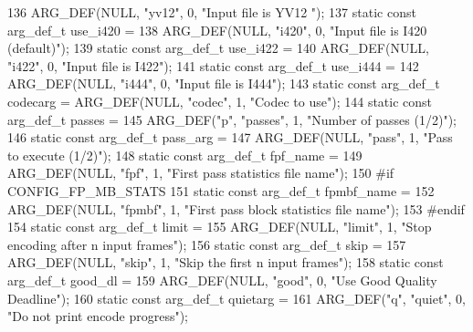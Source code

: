 \begin{DoxyCodeInclude}
{{136     ARG\_DEF(NULL, \textcolor{stringliteral}{"yv12"}, 0, \textcolor{stringliteral}{"Input file is YV12 "});
137 \textcolor{keyword}{static} \textcolor{keyword}{const} arg\_def\_t use\_i420 =
138     ARG\_DEF(NULL, \textcolor{stringliteral}{"i420"}, 0, \textcolor{stringliteral}{"Input file is I420 (default)"});
139 \textcolor{keyword}{static} \textcolor{keyword}{const} arg\_def\_t use\_i422 =
140     ARG\_DEF(NULL, \textcolor{stringliteral}{"i422"}, 0, \textcolor{stringliteral}{"Input file is I422"});
141 \textcolor{keyword}{static} \textcolor{keyword}{const} arg\_def\_t use\_i444 =
142     ARG\_DEF(NULL, \textcolor{stringliteral}{"i444"}, 0, \textcolor{stringliteral}{"Input file is I444"});
143 \textcolor{keyword}{static} \textcolor{keyword}{const} arg\_def\_t codecarg = ARG\_DEF(NULL, \textcolor{stringliteral}{"codec"}, 1, \textcolor{stringliteral}{"Codec to use"});
144 \textcolor{keyword}{static} \textcolor{keyword}{const} arg\_def\_t passes =
145     ARG\_DEF(\textcolor{stringliteral}{"p"}, \textcolor{stringliteral}{"passes"}, 1, \textcolor{stringliteral}{"Number of passes (1/2)"});
146 \textcolor{keyword}{static} \textcolor{keyword}{const} arg\_def\_t pass\_arg =
147     ARG\_DEF(NULL, \textcolor{stringliteral}{"pass"}, 1, \textcolor{stringliteral}{"Pass to execute (1/2)"});
148 \textcolor{keyword}{static} \textcolor{keyword}{const} arg\_def\_t fpf\_name =
149     ARG\_DEF(NULL, \textcolor{stringliteral}{"fpf"}, 1, \textcolor{stringliteral}{"First pass statistics file name"});
150 \textcolor{preprocessor}{#if CONFIG\_FP\_MB\_STATS}
151 \textcolor{keyword}{static} \textcolor{keyword}{const} arg\_def\_t fpmbf\_name =
152     ARG\_DEF(NULL, \textcolor{stringliteral}{"fpmbf"}, 1, \textcolor{stringliteral}{"First pass block statistics file name"});
153 \textcolor{preprocessor}{#endif}
154 \textcolor{keyword}{static} \textcolor{keyword}{const} arg\_def\_t limit =
155     ARG\_DEF(NULL, \textcolor{stringliteral}{"limit"}, 1, \textcolor{stringliteral}{"Stop encoding after n input frames"});
156 \textcolor{keyword}{static} \textcolor{keyword}{const} arg\_def\_t skip =
157     ARG\_DEF(NULL, \textcolor{stringliteral}{"skip"}, 1, \textcolor{stringliteral}{"Skip the first n input frames"});
158 \textcolor{keyword}{static} \textcolor{keyword}{const} arg\_def\_t good\_dl =
159     ARG\_DEF(NULL, \textcolor{stringliteral}{"good"}, 0, \textcolor{stringliteral}{"Use Good Quality Deadline"});
160 \textcolor{keyword}{static} \textcolor{keyword}{const} arg\_def\_t quietarg =
161     ARG\_DEF(\textcolor{stringliteral}{"q"}, \textcolor{stringliteral}{"quiet"}, 0, \textcolor{stringliteral}{"Do not print encode progress"});
}}
\end{DoxyCodeInclude}
